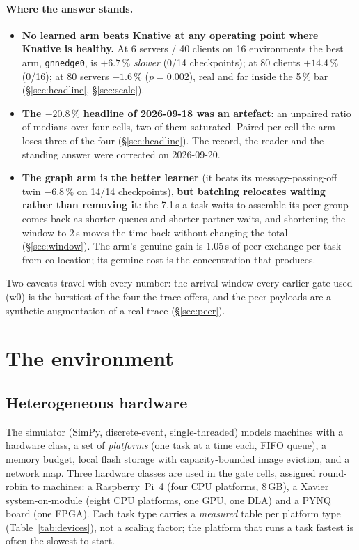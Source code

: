 \documentclass[11pt,a4paper]{article}
\newcommand{\code}[1]{\texttt{\small #1}}
\begin{document}
\paragraph{Where the answer stands.}
\begin{itemize}
  \item \textbf{No learned arm beats Knative at any operating point where Knative is healthy.}
  At 6 servers / 40 clients on 16 environments the best arm, \code{gnnedge0}, is $+6.7\,\%$
  \emph{slower} (0/14 checkpoints); at 80 clients $+14.4\,\%$ (0/16); at 80 servers $-1.6\,\%$
  ($p=0.002$), real and far inside the 5\,\% bar (\S\ref{sec:headline}, \S\ref{sec:scale}).
  \item \textbf{The $-20.8\,\%$ headline of 2026-09-18 was an artefact}: an unpaired ratio of
  medians over four cells, two of them saturated. Paired per cell the arm loses three of the
  four (\S\ref{sec:headline}). The record, the reader and the standing answer were corrected on
  2026-09-20.
  \item \textbf{The graph arm is the better learner} (it beats its message-passing-off twin
  $-6.8\,\%$ on 14/14 checkpoints), \textbf{but batching relocates waiting rather than removing
  it}: the 7.1\,s a task waits to assemble its peer group comes back as shorter queues and
  shorter partner-waits, and shortening the window to 2\,s moves the time back without changing
  the total (\S\ref{sec:window}). The arm's genuine gain is 1.05\,s of peer exchange per task
  from co-location; its genuine cost is the concentration that produces.
\end{itemize}
Two caveats travel with every number: the arrival window every earlier gate used (w0) is the
burstiest of the four the trace offers, and the peer payloads are a synthetic augmentation of a
real trace (\S\ref{sec:peer}).

\section{The environment}
\label{sec:env}

\subsection{Heterogeneous hardware}

The simulator (SimPy, discrete-event, single-threaded) models machines with a hardware class, a set
of \emph{platforms} (one task at a time each, FIFO queue), a memory budget, local flash storage
with capacity-bounded image eviction, and a network map. Three hardware classes are used in the
gate cells, assigned round-robin to machines: a Raspberry~Pi~4 (four CPU platforms, 8\,GB), a
Xavier system-on-module (eight CPU platforms, one GPU, one DLA) and a PYNQ board (one FPGA). Each
task type carries a \emph{measured} table per platform type (Table~\ref{tab:devices}), not a
scaling factor; the platform that runs a task fastest is often the slowest to start.
\end{document}
